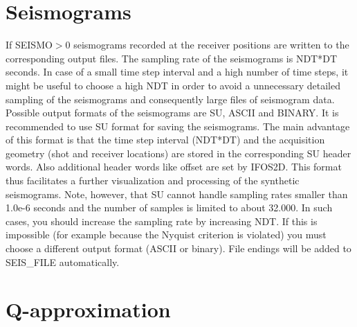 \section{Seismograms}
\label{seismograms_json}
{\color{blue}{\begin{verbatim}
"Seismograms" : "comment",
			"NDT" : "1",
			"SEIS_FORMAT" : "1",
			"SEIS_FILE" : "su/IFOS2D",
\end{verbatim}}}

{\color{red}{\begin{verbatim}
Default values are:
	NDT=1
\end{verbatim}}}

If SEISMO$>$0 seismograms recorded at the receiver positions are written to the corresponding output files. The sampling rate of the seismograms is NDT*DT seconds. In case of a small time step interval and a high number of time steps, it might be useful to choose a high NDT in order to avoid a unnecessary detailed sampling of the seismograms and consequently large files of seismogram data. Possible output formats of the seismograms are SU, ASCII and BINARY. It is recommended to use SU format for saving the seismograms. The main advantage of this format is that the time step interval (NDT*DT) and the acquisition geometry (shot and receiver locations) are stored in the corresponding SU header words. Also additional header words like offset are set by IFOS2D. This format thus facilitates a further visualization and processing of the synthetic seismograms. Note, however, that SU cannot handle sampling rates smaller than 1.0e-6 seconds and the number of samples is limited to about 32.000. In such cases, you should increase the sampling rate by increasing NDT. If this is impossible (for example because the Nyquist criterion is violated) you must choose a different output format (ASCII or binary). File endings will be added to SEIS\_FILE automatically. 


\section{Q-approximation}
\label{q_approx}
{\color{blue}{\begin{verbatim}
"Q-approximation",
			"L" : "0",
			"FL1" : "50.0", 
			"FL2" : "100.0",
			"TAU" : "0.00001",
			"F_REF" : "100",

\end{verbatim}}}

{\color{red}{\begin{verbatim}
Default values are:
	L=0
\end{verbatim}}}


